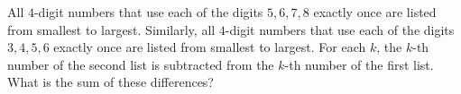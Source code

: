 All $4$-digit numbers that use each of the digits $5,6,7,8$ exactly once are listed from smallest to largest. Similarly, all $4$-digit numbers that use each of the digits $3,4,5,6$ exactly once are listed from smallest to largest. For each $k$, the $k$-th number of the second list is subtracted from the $k$-th number of the first list. What is the sum of these differences?
